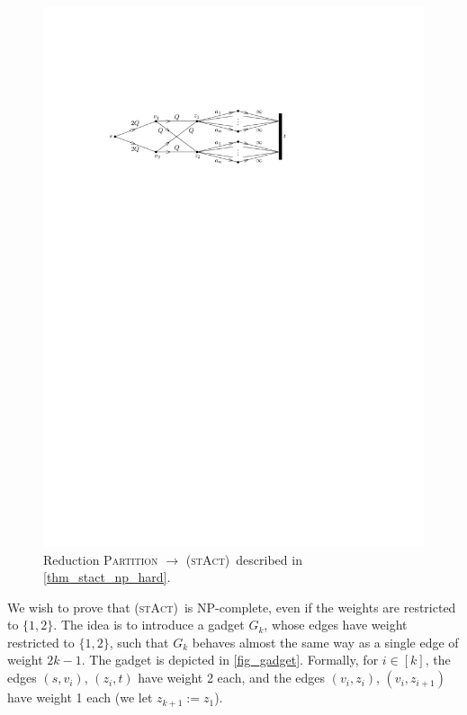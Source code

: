 \documentclass[runningheads]{llncs}
\numberwithin{equation}{section}
\newcommand{\set}[1]{\{ #1 \}}
\newcommand{\stact}{\textsc{(stAct)}}
\begin{document}
\begin{figure}[htpb]
\centering
\includegraphics[scale=1]{img/st-act-np-hard}
\caption{Reduction \textsc{Partition} $\rightarrow$ \stact\ described in \cref{thm_stact_np_hard}.}
\label{fig_stact_np_hard}
\end{figure}

We wish to prove that \stact\ is NP-complete, even if the weights are restricted to $\set{1, 2}$. The idea is to introduce a gadget $G_k$, whose edges have weight restricted to $\set{1,2}$, such that $G_k$ behaves almost the same way as a single edge of weight $2k - 1$. The gadget is depicted in \cref{fig_gadget}. Formally, for $i \in [k]$, the edges $(s, v_i)$, $(z_i, t)$ have weight 2 each, and the edges $(v_i, z_i)$, $(v_i, z_{i+1})$ have weight 1 each (we let $z_{k+1} := z_1$).
\end{document}

